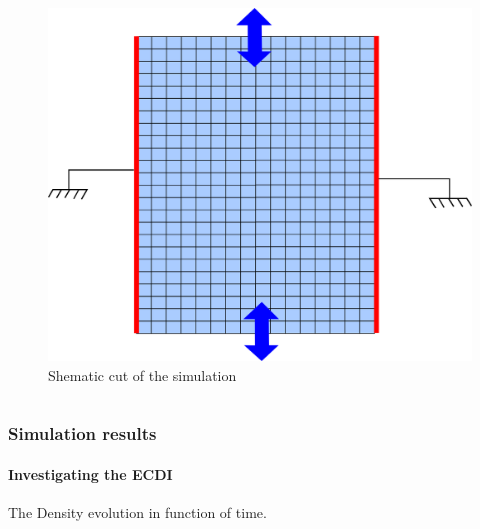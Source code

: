 \documentclass[sans, aspectratio=169]{beamer}
\begin{document}
\begin{frame}
\begin{columns}
	\begin{column}{0.45\linewidth}
		\begin{figure}[hbtp]
		\centering
		\includegraphics[scale=0.5]{images/2D_Rtheta.png}
		\caption{Shematic cut of the simulation}
		\end{figure}
	
	\end{column}


\end{columns}		
	
	
\end{frame}

\begin{frame} 
	\frametitle{Simulation results} 
	\framesubtitle{ Investigating the ECDI } 

	\begin{center}
	The Density evolution in function of time.\\
	
	\end{center}
\end{frame}
\end{document}
